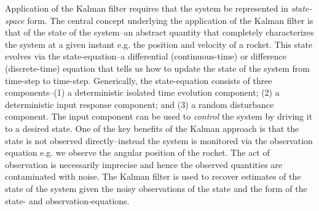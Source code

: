 \documentclass[a4paper,fleqn,usenatbib]{mnras}
\begin{document}
Application of the Kalman filter requires that the system be represented in \textit{state-space} form. The central concept underlying the application of the Kalman filter is that of the state of the system--an abstract quantity that completely characterizes the system at a given instant e.g. the position and velocity of a rocket. This state evolves via the state-equation--a differential (continuous-time) or difference (discrete-time) equation that tells us how to update the state of the system from time-step to time-step. Generically, the state-equation consists of three components--(1) a deterministic isolated time evolution component; (2) a deterministic input response component; and (3) a random disturbance component. The input component can be used to \textit{control} the system by driving it to a desired state. One of the key benefits of the Kalman approach is that the state is not observed directly--instead the system is monitored via the observation equation e.g. we observe the angular position of the rocket. The act of observation is necessarily imprecise and hence the observed quantities are contaminated with noise. The Kalman filter is used to recover estimates of the state of the system given the noisy observations of the state and the form of the state- and observation-equations.

\end{document}

